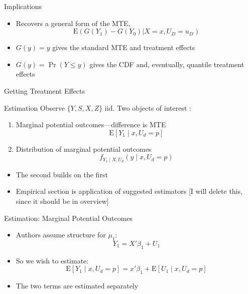 \documentclass{beamer}
\newcommand{\E}{\mathrm{E}} %
\begin{document}
\begin{frame}{Implications}

\begin{itemize}

\item Recovers a general form of the MTE,
$$ \E\left( G(Y_1) - G(Y_0) | X = x, U_D = u_D \right) $$

\item $G(y) = y$ gives the standard MTE and treatment effects
\item $G(y) = \Pr(Y \leq y)$ gives the CDF and, eventually, quantile
  treatment effects


\end{itemize}

\end{frame}


\begin{frame}{Getting Treatment Effects}
\end{frame}



\begin{frame}{Estimation}
Observe $\{Y,S,X,Z\}$ iid. Two objects of interest :
\begin{enumerate}
\item Marginal potential outcomes---difference is MTE
\begin{equation*}
  \mathrm{E}[Y_1\mid x,U_d=p]
\end{equation*}
\item Distribution of marginal potential outcomes
  \begin{equation*}
    f_{Y_1\mid X,U_d}(y\mid x,U_d=p)
  \end{equation*}
\end{enumerate}
\begin{itemize}
\item The second builds on the first
\item Empirical section is application of suggested estimators [I will
  delete this, since it should be in overview]
\end{itemize}

\end{frame}

\begin{frame}{Estimation: Marginal Potential Outcomes  }
  \begin{itemize}
  \item Authors assume structure for $\mu_1$:
    \begin{equation*}
      Y_1  = X'\beta_1 +  U_1
    \end{equation*}
\item So we wish to estimate:
    \begin{equation*}
      \mathrm{E}[Y_1\mid x,U_d=p]  = x'\beta_1 +  \mathrm{E}[U_1\mid x,U_d=p]
    \end{equation*}
\item The two terms are estimated separately
  \end{itemize}
\end{frame}
\end{document}
